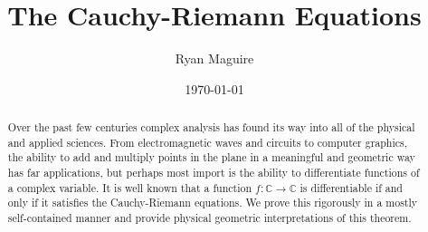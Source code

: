 \documentclass{article}
\title{The Cauchy-Riemann Equations}
\author{Ryan Maguire}
\date{\today}
\theoremstyle{definition}
\begin{document}
    \maketitle
    \begin{abstract}
        Over the past few centuries complex analysis has found its way into all
        of the physical and applied sciences. From electromagnetic waves and
        circuits to computer graphics, the ability to add and multiply points
        in the plane in a meaningful and geometric way has far applications,
        but perhaps most import is the ability to differentiate functions of
        a complex variable. It is well known that a function
        $f:\mathbb{C}\rightarrow\mathbb{C}$ is differentiable if and only if
        it satisfies the Cauchy-Riemann equations. We prove this rigorously
        in a mostly self-contained manner and provide physical geometric
        interpretations of this theorem.
    \end{abstract}
    \tableofcontents
\end{document}
